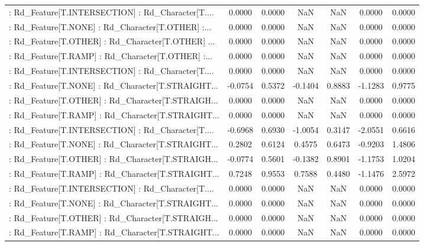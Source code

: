 \begin{longtable}{p{4cm}cccccc}
 : Rd\_Feature[T.INTERSECTION] : Rd\_Character[T.... &  0.0000 &    0.0000 &     NaN &          NaN &  0.0000 &  0.0000 \\
 : Rd\_Feature[T.NONE] : Rd\_Character[T.OTHER] :... &  0.0000 &    0.0000 &     NaN &          NaN &  0.0000 &  0.0000 \\
 : Rd\_Feature[T.OTHER] : Rd\_Character[T.OTHER] ... &  0.0000 &    0.0000 &     NaN &          NaN &  0.0000 &  0.0000 \\
 : Rd\_Feature[T.RAMP] : Rd\_Character[T.OTHER] :... &  0.0000 &    0.0000 &     NaN &          NaN &  0.0000 &  0.0000 \\
 : Rd\_Feature[T.INTERSECTION] : Rd\_Character[T.... &  0.0000 &    0.0000 &     NaN &          NaN &  0.0000 &  0.0000 \\
 : Rd\_Feature[T.NONE] : Rd\_Character[T.STRAIGHT... & -0.0754 &    0.5372 & -0.1404 &       0.8883 & -1.1283 &  0.9775 \\
 : Rd\_Feature[T.OTHER] : Rd\_Character[T.STRAIGH... &  0.0000 &    0.0000 &     NaN &          NaN &  0.0000 &  0.0000 \\
 : Rd\_Feature[T.RAMP] : Rd\_Character[T.STRAIGHT... &  0.0000 &    0.0000 &     NaN &          NaN &  0.0000 &  0.0000 \\
 : Rd\_Feature[T.INTERSECTION] : Rd\_Character[T.... & -0.6968 &    0.6930 & -1.0054 &       0.3147 & -2.0551 &  0.6616 \\
 : Rd\_Feature[T.NONE] : Rd\_Character[T.STRAIGHT... &  0.2802 &    0.6124 &  0.4575 &       0.6473 & -0.9203 &  1.4806 \\
 : Rd\_Feature[T.OTHER] : Rd\_Character[T.STRAIGH... & -0.0774 &    0.5601 & -0.1382 &       0.8901 & -1.1753 &  1.0204 \\
 : Rd\_Feature[T.RAMP] : Rd\_Character[T.STRAIGHT... &  0.7248 &    0.9553 &  0.7588 &       0.4480 & -1.1476 &  2.5972 \\
 : Rd\_Feature[T.INTERSECTION] : Rd\_Character[T.... &  0.0000 &    0.0000 &     NaN &          NaN &  0.0000 &  0.0000 \\
 : Rd\_Feature[T.NONE] : Rd\_Character[T.STRAIGHT... &  0.0000 &    0.0000 &     NaN &          NaN &  0.0000 &  0.0000 \\
 : Rd\_Feature[T.OTHER] : Rd\_Character[T.STRAIGH... &  0.0000 &    0.0000 &     NaN &          NaN &  0.0000 &  0.0000 \\
 : Rd\_Feature[T.RAMP] : Rd\_Character[T.STRAIGHT... &  0.0000 &    0.0000 &     NaN &          NaN &  0.0000 &  0.0000 \\

\end{longtable}
